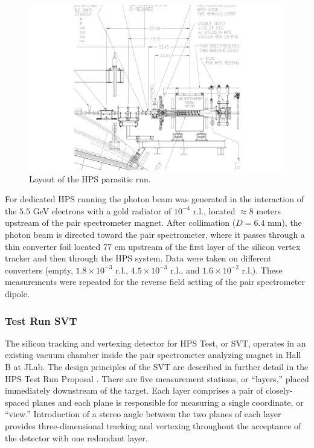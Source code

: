 \begin{figure}[ht]
    \includegraphics[width=\textwidth]{test2012/HPS_dimensions}
\caption{\small{Layout of the HPS parasitic run.} }
\label{fig:hpstest_layout}
\end{figure}

For dedicated HPS running the photon beam was generated in the interaction of the $5.5$ GeV electrons with a gold radiator of $10^{-4}$ r.l., located $\approx 8$ meters upstream of the pair spectrometer magnet. After collimation ($D=6.4$ mm), the photon beam is directed toward the pair spectrometer, where it passes through a thin  converter foil located 77 cm upstream of the first layer of the silicon vertex tracker and then through the HPS system. Data were taken on different converters (empty, $1.8\times 10^{-3}$ r.l., $4.5\times 10^{-3}$ r.l., and $1.6\times 10^{-2}$ r.l.). These measurements were repeated for the reverse field setting of the pair spectrometer dipole.

\subsubsection{Test Run SVT}
\label{sec:svt_testrun}
The silicon tracking and vertexing detector for HPS Test, or SVT, operates in an existing vacuum chamber inside the pair spectrometer analyzing magnet in Hall B at JLab.  The design principles of the SVT are described in further detail in the HPS Test Run Proposal  \cite{HPS_tPROP}. There are five measurement stations, or ``layers,'' placed immediately downstream of the target. Each layer comprises a pair of closely-spaced planes and each plane is responsible for measuring a single coordinate, or ``view.'' Introduction of a stereo angle between the two planes of each layer provides three-dimensional tracking and vertexing throughout the acceptance of the detector with one redundant layer. 

